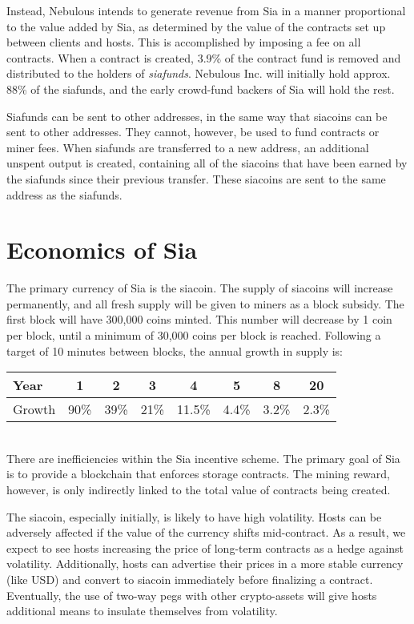\documentclass[twocolumn]{article}
\begin{document}
Instead, Nebulous intends to generate revenue from Sia in a manner proportional to the value added by Sia, as determined by the value of the contracts set up between clients and hosts.
This is accomplished by imposing a fee on all contracts.
When a contract is created, 3.9\% of the contract fund is removed and distributed to the holders of \textit{siafunds}.
Nebulous Inc. will initially hold approx. 88\% of the siafunds, and the early crowd-fund backers of Sia will hold the rest.

Siafunds can be sent to other addresses, in the same way that siacoins can be sent to other addresses.
They cannot, however, be used to fund contracts or miner fees.
When siafunds are transferred to a new address, an additional unspent output is created, containing all of the siacoins that have been earned by the siafunds since their previous transfer.
These siacoins are sent to the same address as the siafunds.

\section{Economics of Sia}
The primary currency of Sia is the siacoin.
The supply of siacoins will increase permanently, and all fresh supply will be given to miners as a block subsidy.
The first block will have 300,000 coins minted.
This number will decrease by 1 coin per block, until a minimum of 30,000 coins per block is reached.
Following a target of 10 minutes between blocks, the annual growth in supply is:\\

\tabcolsep=0.11cm \noindent
\begin{tabular}{ l | *{7}{c} }
	Year   &   1  &  2   &   3  &   4    &   5   &  8    & 20    \\ \hline
	Growth & 90\% & 39\% & 21\% & 11.5\% & 4.4\% & 3.2\% & 2.3\%
\end{tabular} \\

There are inefficiencies within the Sia incentive scheme.
The primary goal of Sia is to provide a blockchain that enforces storage contracts.
The mining reward, however, is only indirectly linked to the total value of contracts being created.

The siacoin, especially initially, is likely to have high volatility.
Hosts can be adversely affected if the value of the currency shifts mid-contract.
As a result, we expect to see hosts increasing the price of long-term contracts as a hedge against volatility.
Additionally, hosts can advertise their prices in a more stable currency (like USD) and convert to siacoin immediately before finalizing a contract.
Eventually, the use of two-way pegs with other crypto-assets will give hosts additional means to insulate themselves from volatility.
\end{document}
